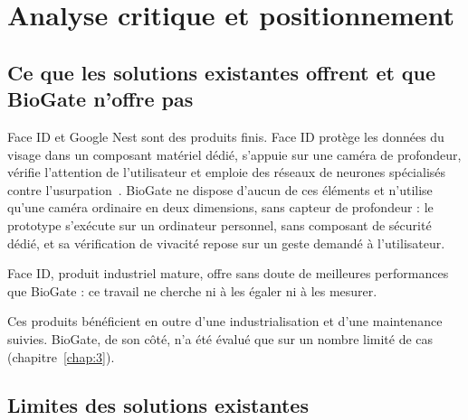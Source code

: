 \section{Analyse critique et positionnement}

\subsection{Ce que les solutions existantes offrent et que BioGate n'offre pas}

Face ID et Google Nest sont des produits finis. Face ID protège les données du visage dans un composant matériel dédié, s'appuie sur une caméra de profondeur, vérifie l'attention de l'utilisateur et emploie des réseaux de neurones spécialisés contre l'usurpation~\cite{apple2026faceid,apple_biometric_security}. BioGate ne dispose d'aucun de ces éléments et n'utilise qu'une caméra ordinaire en deux dimensions, sans capteur de profondeur : le prototype s'exécute sur un ordinateur personnel, sans composant de sécurité dédié, et sa vérification de vivacité repose sur un geste demandé à l'utilisateur. \begin{maj}
Face ID, produit industriel mature, offre sans doute de meilleures performances que BioGate : ce travail ne cherche ni à les égaler ni à les mesurer.
\end{maj}

Ces produits bénéficient en outre d'une industrialisation et d'une maintenance suivies. BioGate, de son côté, n'a été évalué que sur un nombre limité de cas (chapitre~\ref{chap:3}).

\subsection{Limites des solutions existantes}\label{sec:limites}

